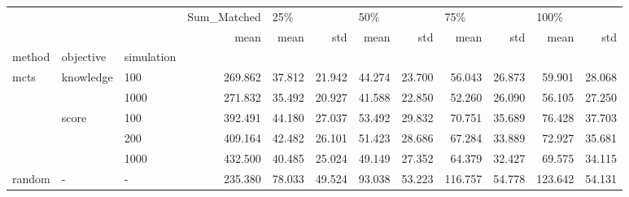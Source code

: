 \begin{tabular}{lllrrrrrrrrr}
\toprule
       &   &   & Sum\_Matched & \multicolumn{2}{l}{25\%} & \multicolumn{2}{l}{50\%} & \multicolumn{2}{l}{75\%} & \multicolumn{2}{l}{100\%} \\
       &   &   &        mean &   mean &    std &   mean &    std &    mean &    std &    mean &    std \\
method & objective & simulation &             &        &        &        &        &         &        &         &        \\
\midrule
mcts & knowledge & 100 &     269.862 & 37.812 & 21.942 & 44.274 & 23.700 &  56.043 & 26.873 &  59.901 & 28.068 \\
       &   & 1000 &     271.832 & 35.492 & 20.927 & 41.588 & 22.850 &  52.260 & 26.090 &  56.105 & 27.250 \\
       & score & 100 &     392.491 & 44.180 & 27.037 & 53.492 & 29.832 &  70.751 & 35.689 &  76.428 & 37.703 \\
       &   & 200 &     409.164 & 42.482 & 26.101 & 51.423 & 28.686 &  67.284 & 33.889 &  72.927 & 35.681 \\
       &   & 1000 &     432.500 & 40.485 & 25.024 & 49.149 & 27.352 &  64.379 & 32.427 &  69.575 & 34.115 \\
random & - & - &     235.380 & 78.033 & 49.524 & 93.038 & 53.223 & 116.757 & 54.778 & 123.642 & 54.131 \\
\bottomrule
\end{tabular}
